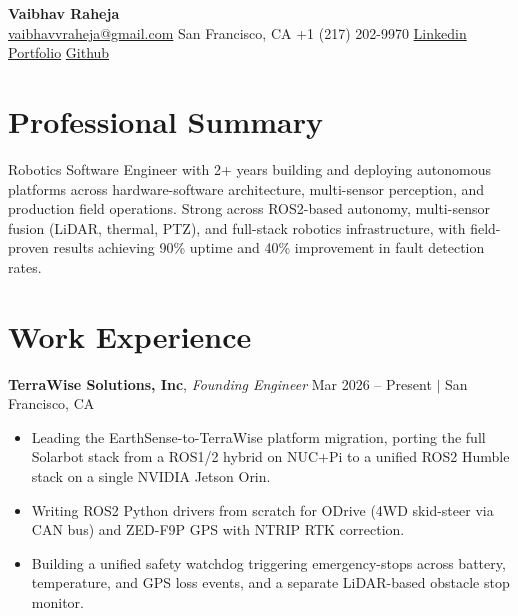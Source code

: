 \documentclass[9pt, a4paper]{article}
\newcommand{\workheader}[3]{%
  \textbf{#1}, \textit{#2} \hfill #3%
}
\begin{document}
\pagestyle{empty}

\begin{center}
  {\Large\bfseries\color{nameblue} Vaibhav Raheja}\\[1pt]
  \small
  \faEnvelope\enspace\href{mailto:vaibhavvraheja@gmail.com}{vaibhavvraheja@gmail.com}
  \quad\faMapMarker*\enspace San Francisco, CA
  \quad\faPhone\enspace +1 (217) 202-9970
  \quad\faLinkedin\enspace\href{https://linkedin.com/in/vaibhav-raheja}{Linkedin}
  \quad\faLink\enspace\href{https://vaibhav-raheja.github.io}{Portfolio}
  \quad\faGithub\enspace\href{https://github.com/Vaibhav-Raheja}{Github}
\end{center}

\section{Professional Summary}
Robotics Software Engineer with 2+ years building and deploying autonomous platforms across hardware-software architecture, multi-sensor perception, and production field operations. Strong across ROS2-based autonomy, multi-sensor fusion (LiDAR, thermal, PTZ), and full-stack robotics infrastructure, with field-proven results achieving 90\% uptime and 40\% improvement in fault detection rates.

\section{Work Experience}

\workheader{TerraWise Solutions, Inc}{Founding Engineer}{Mar 2026 – Present $|$ San Francisco, CA}
\begin{itemize}[leftmargin=1.2em, topsep=2pt, itemsep=0pt, parsep=0pt]
  \item Leading the EarthSense-to-TerraWise platform migration, porting the full Solarbot stack from a ROS1/2 hybrid on NUC+Pi to a unified ROS2 Humble stack on a single NVIDIA Jetson Orin.
  \item Writing ROS2 Python drivers from scratch for ODrive (4WD skid-steer via CAN bus) and ZED-F9P GPS with NTRIP RTK correction.
  \item Building a unified safety watchdog triggering emergency-stops across battery, temperature, and GPS loss events, and a separate LiDAR-based obstacle stop monitor.
\end{itemize}
\end{document}
